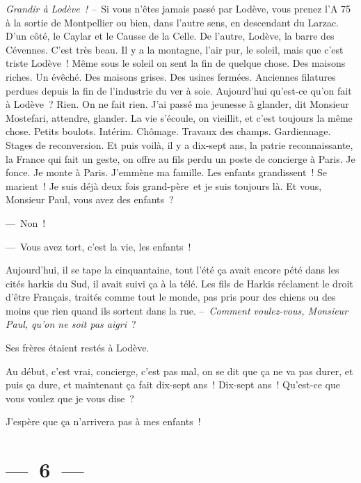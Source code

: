 \documentclass[french,twoside]{book} %
\begin{document}
\noindent \emph{Grandir à Lodève ! –} Si vous n’êtes jamais passé par Lodève, vous prenez l’A 75 à la sortie de Montpellier ou bien, dans l’autre sens, en descendant du Larzac. D’un côté, le Caylar et le Causse de la Celle. De l’autre, Lodève, la barre des Cévennes. C’est très beau. Il y a la montagne, l’air pur, le soleil, mais que c’est triste Lodève ! Même sous le soleil on sent la fin de quelque chose. Des maisons riches. Un évêché. Des maisons grises. Des usines fermées. Anciennes filatures perdues depuis la fin de l’industrie du ver à soie. Aujourd’hui qu’est-ce qu’on fait à Lodève ? Rien. On ne fait rien. J’ai passé ma jeunesse à glander, dit Monsieur Mostefari, attendre, glander. La vie s’écoule, on vieillit, et c’est toujours la même chose. Petits boulots. Intérim. Chômage. Travaux des champs. Gardiennage. Stages de reconversion. Et puis voilà, il y a dix-sept ans, la patrie reconnaissante, la France qui fait un geste, on offre au fils perdu un poste de concierge à Paris. Je fonce. Je monte à Paris. J’emmène ma famille. Les enfants grandissent ! Se marient ! Je suis déjà deux fois grand-père et je suis toujours là. Et vous, Monsieur Paul, vous avez des enfants ?\par
— Non !\par
— Vous avez tort, c’est la vie, les enfants !\par
Aujourd’hui, il se tape la cinquantaine, tout l’été ça avait encore pété dans les cités harkis du Sud, il avait suivi ça à la télé. Les fils de Harkis réclament le droit d’être Français, traités comme tout le monde, pas pris pour des chiens ou des moins que rien quand ils sortent dans la rue. – \emph{Comment voulez-vous, Monsieur Paul, qu’on ne soit pas aigri} ?\par
Ses frères étaient restés à Lodève.\par
Au début, c’est vrai, concierge, c’est pas mal, on se dit que ça ne va pas durer, et puis ça dure, et maintenant ça fait dix-sept ans ! Dix-sept ans ! Qu’est-ce que vous voulez que je vous dise ?\par
J’espère que ça n’arrivera pas à mes enfants !

\section[{— 6 —}]{— 6 —}
\renewcommand{\leftmark}{— 6 —}
\end{document}
